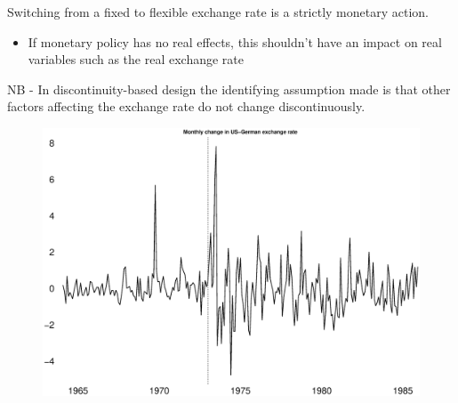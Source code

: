 \documentclass{beamer}
\begin{document}
\begin{frame}
 Switching from a fixed to flexible exchange rate is a strictly monetary action. 
 \begin{itemize}
   \item If monetary policy has no real effects, this shouldn't have an impact on real variables such as the real exchange rate
 \end{itemize}
  \medskip
  NB - In discontinuity-based design the identifying assumption made is that other factors affecting the exchange rate do not change discontinuously.
\end{frame}

\begin{frame}
  \begin{figure}
    \includegraphics[scale=.3]{exchange_rate.eps}
  \end{figure}  
\end{frame}

\end{document}
